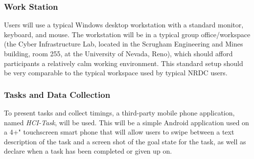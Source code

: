 \documentclass{article}
\begin{document}
\subsubsection{Work Station}
Users will use a typical Windows desktop workstation with a standard monitor, keyboard, and mouse. The workstation will be in a typical group office/workspace (the Cyber Infrastructure Lab, located in the Scrugham Engineering and Mines building, room 255, at the University of Nevada, Reno), which should afford participants a relatively calm working environment. This standard setup should be very comparable to the typical workspace used by typical NRDC users.

\subsubsection{Tasks and Data Collection}
To present tasks and collect timings, a third-party mobile phone application, named \emph{HCI-Task}, will be used. This will be a simple Android application used on a 4+" touchscreen smart phone that will allow users to swipe between a text description of the task and a screen shot of the goal state for the task, as well as declare when a task has been completed or given up on.

%
\end{document}
